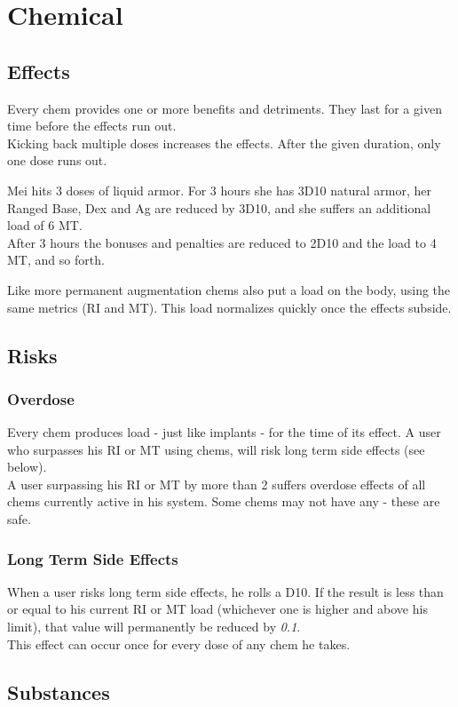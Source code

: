 \section{Chemical}
\label{sec:chems}

\subsection{Effects}
Every chem provides one or more benefits and detriments.
They last for a given time before the effects run out.
\\%
Kicking back multiple doses increases the effects.
After the given duration, only one dose runs out.
\par%
\begin{exampleblock}
	Mei hits 3 doses of liquid armor.
	For 3 hours she has 3D10 natural armor,
	her Ranged Base, Dex and Ag are reduced by 3D10,
	and she suffers an additional load of 6 MT.
	\\%
	After 3 hours the bonuses and penalties are reduced to 2D10 and the load to 4 MT, and so forth.
\end{exampleblock}
Like more permanent augmentation chems also put a load on the body, using the same metrics (RI and MT).
This load normalizes quickly once the effects subside.

\subsection{Risks}
\subsubsection*{Overdose}
Every chem produces load - just like implants
	- for the time of its effect.
A user who surpasses his RI or MT using chems,
	will risk long term side effects (see below).
\\%
A user surpassing his RI or MT by more than 2 suffers overdose effects
	of all chems currently active in his system.
Some chems may not have any - these are safe.
\subsubsection*{Long Term Side Effects}
When a user risks long term side effects,
	he rolls a D10.
If the result is
	less than or equal to
	his current RI or MT load
		(whichever one is higher and above his limit),
	that value will permanently be reduced by \emph{0.1}.
\\%
This effect can occur once for every dose of any chem he takes.

\subsection{Substances}
